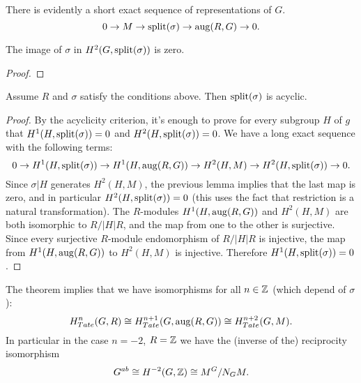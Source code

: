 There is evidently a short exact sequence of representations of $G$.
\[
	0 \to M \to \mathrm{split}(\sigma) \to \mathrm{aug}(R,G) \to 0.
\]

\begin{lemma}
	The image of $\sigma$ in $H^2(G,\mathrm{split}(\sigma))$ is zero.
\end{lemma}

\begin{proof}

\end{proof}

\begin{theorem}
	Assume $R$ and $\sigma$ satisfy the conditions above.
	Then	$\mathrm{split}(\sigma)$ is acyclic.
\end{theorem}

\begin{proof}
	By the acyclicity criterion, it's enough to prove for every subgroup $H$ of $g$ that
	$H^1(H,\mathrm{split}(\sigma))=0$ and $H^2(H,\mathrm{split}(\sigma))=0$.
	We have a long exact sequence with the following terms:
	\[
		0 \to H^1(H,\mathrm{split}(\sigma)) \to H^1(H,\mathrm{aug}(R,G)) \to H^2(H,M) \to H^2(H,\mathrm{split}(\sigma))
		\to 0.
	\]
	Since $\sigma|H$ generates $H^2(H,M)$, the previous lemma implies that the last map is zero,
	and in particular $H^2(H,\mathrm{split}(\sigma))=0$ (this uses the fact that restriction is a natural
	transformation).
	The $R$-modules $H^1(H,\mathrm{aug}(R,G))$ and $H^2(H,M)$ are both isomorphic to $R / |H|R$,
	and the map from one to the other is surjective.
	Since every surjective $R$-module endomorphism of $R /|H|R$ is injective, the map
	from $H^1(H,\mathrm{aug}(R,G))$ to $H^2(H,M)$ is injective.
	Therefore $H^1(H,\mathrm{split}(\sigma))=0$.
\end{proof}



The theorem implies that we have isomorphisms for all $n\in {\mathbb Z}$ (which depend of $\sigma$):
\[
	H^{n}_{Tate}(G,R) \cong H^{n+1}_{Tate}(G,\mathrm{aug}(R,G)) \cong H^{n+2}_{Tate}(G,M).
\]
In particular in the case $n = -2$, $R = {\mathbb Z}$ we have the (inverse of the) reciprocity isomorphism
\[
	G^{ab} \cong H^{-2}(G,{\mathbb Z}) \cong M^G / N_G M.
\]
